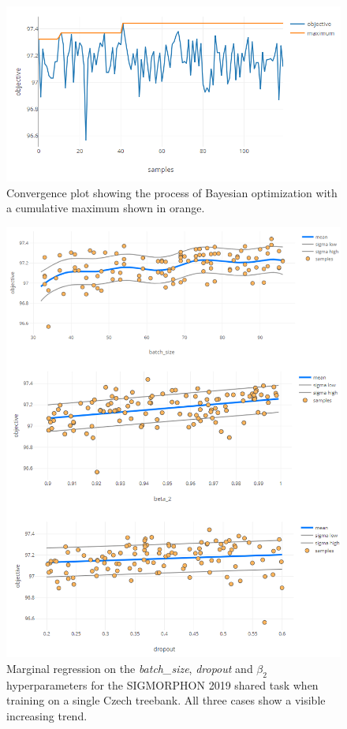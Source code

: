 \begin{figure}
	\begin{center}
		\includegraphics[width=1.0\textwidth]{images/czech-convergence.png}
		\caption{Convergence plot showing the process of Bayesian optimization with a cumulative maximum shown in orange.}
		\label{figure:czech-convergence}
	\end{center}
\end{figure}

\begin{figure}
	\begin{center}
		\includegraphics[width=1.0\textwidth]{images/czech-hyperparam-trends.png}
		\caption{Marginal regression on the \emph{batch\_size}, \emph{dropout} and $\beta_2$ hyperparameters for the SIGMORPHON 2019 shared task when training on a single Czech treebank. All three cases show a visible increasing trend.}
		\label{figure:czech-batch-size}
	\end{center}
\end{figure}



